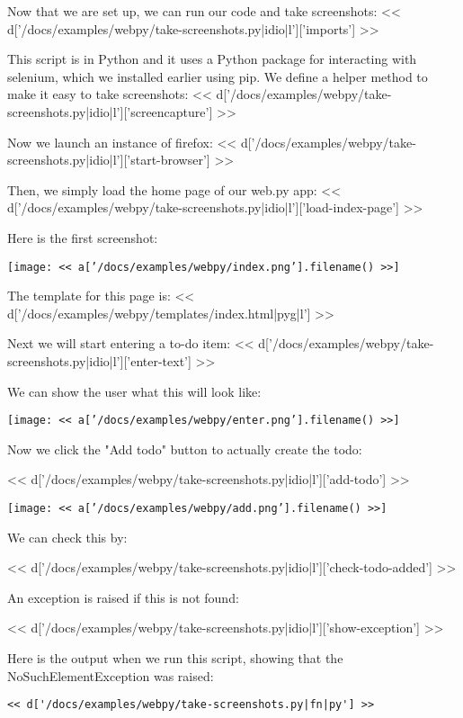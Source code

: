 \documentclass[custom, plainsections]{sciposter}
\begin{document}
\begin{multicols*}{2}
Now that we are set up, we can run our code and take screenshots:
<< d['/docs/examples/webpy/take-screenshots.py|idio|l']['imports'] >>

This script is in Python and it uses a Python package for interacting with selenium, which we installed earlier using pip. We define a helper method to make it easy to take screenshots:
<< d['/docs/examples/webpy/take-screenshots.py|idio|l']['screencapture'] >>

Now we launch an instance of firefox:
<< d['/docs/examples/webpy/take-screenshots.py|idio|l']['start-browser'] >>

Then, we simply load the home page of our web.py app:
<< d['/docs/examples/webpy/take-screenshots.py|idio|l']['load-index-page'] >>

Here is the first screenshot:

\texttt{[image: << a['/docs/examples/webpy/index.png'].filename() >>]}

\vspace{3cm}

The template for this page is:
<< d['/docs/examples/webpy/templates/index.html|pyg|l'] >>

Next we will start entering a to-do item:
<< d['/docs/examples/webpy/take-screenshots.py|idio|l']['enter-text'] >>

We can show the user what this will look like:

\texttt{[image: << a['/docs/examples/webpy/enter.png'].filename() >>]}

Now we click the "Add todo" button to actually create the todo:

<< d['/docs/examples/webpy/take-screenshots.py|idio|l']['add-todo'] >>

\texttt{[image: << a['/docs/examples/webpy/add.png'].filename() >>]}

We can check this by:

<< d['/docs/examples/webpy/take-screenshots.py|idio|l']['check-todo-added'] >>

An exception is raised if this is not found:

<< d['/docs/examples/webpy/take-screenshots.py|idio|l']['show-exception'] >>

Here is the output when we run this script, showing that the NoSuchElementException was raised:
\begin{Verbatim}
<< d['/docs/examples/webpy/take-screenshots.py|fn|py'] >>
\end{Verbatim}


\end{multicols*}
\end{document}
